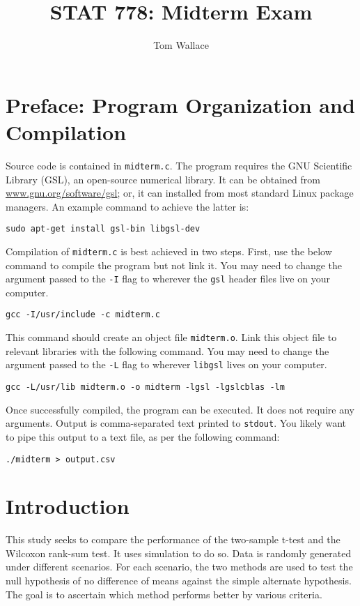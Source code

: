\documentclass{report}
\title{STAT 778: Midterm Exam}
\author{Tom Wallace}
\begin{document}
\maketitle

\section*{Preface: Program Organization and Compilation}

Source code is contained in \texttt{midterm.c}. 
The program requires the GNU Scientific Library (GSL), an
open-source numerical library. It can be obtained from
\url{www.gnu.org/software/gsl}; or, it can installed from most standard Linux
package managers. An example command to achieve the latter is:

\begin{center}
	\texttt{sudo apt-get install gsl-bin libgsl-dev}
\end{center}

Compilation of \texttt{midterm.c} is best achieved in two steps. First, use the below
command to compile the program but not link it. You may need to change the
argument passed to the \texttt{-I} flag to wherever the \texttt{gsl} header
files live on your computer. 

\begin{center}
	\texttt{gcc -I/usr/include -c midterm.c}
\end{center}

This command should create an object file \texttt{midterm.o}. Link this 
object file to relevant libraries with the following command.
You may need to change the argument passed to the \texttt{-L} flag to
wherever \texttt{libgsl} lives on your computer.

\begin{center}
	\texttt{gcc -L/usr/lib midterm.o -o midterm -lgsl -lgslcblas -lm}
\end{center}

Once successfully compiled, the program can be executed. It does not require any
arguments. Output is comma-separated text printed to \texttt{stdout}. You likely want to pipe this
output to a text file, as per the following command:

\begin{center}
	\texttt{./midterm > output.csv}
\end{center}

\newpage

\section*{Introduction}
This study seeks to compare the performance of the two-sample t-test and the
Wilcoxon rank-sum test. It uses simulation to do so. Data is randomly generated
under different scenarios. For each scenario, the two methods are used to test the 
null hypothesis of no difference of means against the simple alternate hypothesis. 
The goal is to ascertain which method performs better by various criteria.
\end{document}
